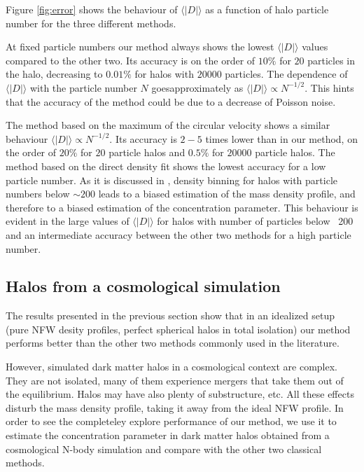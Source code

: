 \documentclass[a4,useAMS,usenatbib,usegraphicx]{mn2e}
\newcommand{\avg}[1]{\langle{#1}\rangle}
\begin{document}
Figure \ref{fig:error} shows the behaviour of $\avg{|D|}$ as a function of
halo particle number for the three different methods.

At fixed particle numbers our method always shows the lowest
$\avg{|D|}$ values compared to the other two.
Its accuracy is on the order of $10\%$ for $20$ particles in the halo,
decreasing to $0.01\%$ for halos with $20000$ particles.  
The dependence of $\avg{|D|}$ with the particle number $N$
goesapproximately as $\avg{|D|}\propto N^{-1/2}$.   
This hints that the accuracy of the method could be due to a decrease
of Poisson noise. 

The method based on the maximum of the circular velocity shows a
similar behaviour $\avg{|D|}\propto N^{-1/2}$.  
Its accuracy is $2-5$ times lower than in our method, on the order of
$20\%$ for $20$  particle halos and $0.5\%$ for $20000$ particle
halos. 
The method  based on the direct density fit shows the lowest accuracy for a low
  particle number. 
  As it is discussed in \citep{Munoz2011}, density binning for halos
  with particle numbers below $\sim200$ leads to a biased estimation
  of the mass density profile, and therefore to a biased estimation of
  the concentration parameter. 
This behaviour is evident in the large values of $\avg{|D|}$ for halos
with number of particles below ~200 and an intermediate accuracy
between the other two methods for a high particle number. 

\subsection{Halos from a cosmological simulation}

The results presented in the previous section show that in an
idealized setup (pure NFW desity profiles, perfect spherical halos in
total isolation) our method performs better than the other two
methods commonly used in the literature.

However, simulated dark matter halos in a cosmological context are
complex. 
They are not isolated, many of them  experience mergers that take them
out of the equilibrium. 
Halos may have also plenty of substructure, etc. All these effects
disturb the mass density profile, taking it  away from the ideal NFW
profile. 
In order to see the completeley explore performance of our method, we use
it to estimate the  concentration parameter in dark matter halos
obtained from a cosmological N-body simulation and compare with the
other two classical methods.   
 
\end{document}

